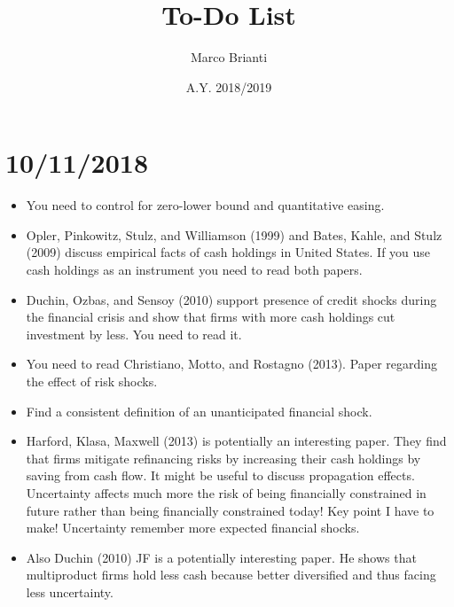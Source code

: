 \documentclass{article}
\title{To-Do List}
\author{Marco Brianti}
\date{A.Y. 2018/2019}
\begin{document}
	\large{

\maketitle

\section*{10/11/2018}

\begin{itemize}
	\item You need to control for zero-lower bound and quantitative easing.
	\item Opler, Pinkowitz, Stulz, and Williamson (1999) and Bates, Kahle, and Stulz (2009) discuss empirical facts of cash holdings in United States. If you use cash holdings as an instrument you need to read both papers.
	\item Duchin, Ozbas, and Sensoy (2010) support presence of credit shocks during the financial crisis and show that firms with more cash holdings cut investment by less. You need to read it. 
	\item You need to read Christiano, Motto, and Rostagno (2013). Paper regarding the effect of risk shocks.
	\item Find a consistent definition of an unanticipated financial shock.
	\item Harford, Klasa, Maxwell (2013) is potentially an interesting paper. They find that firms mitigate refinancing risks by increasing their cash holdings by saving from cash flow. It might be useful to discuss propagation effects. Uncertainty affects much more the risk of being financially constrained in future rather than being financially constrained today! Key point I have to make! Uncertainty remember more expected financial shocks.
	\item Also Duchin (2010) JF is a potentially interesting paper. He shows that multiproduct firms hold less cash because better diversified and thus facing less uncertainty.
\end{itemize}


}
\end{document}
